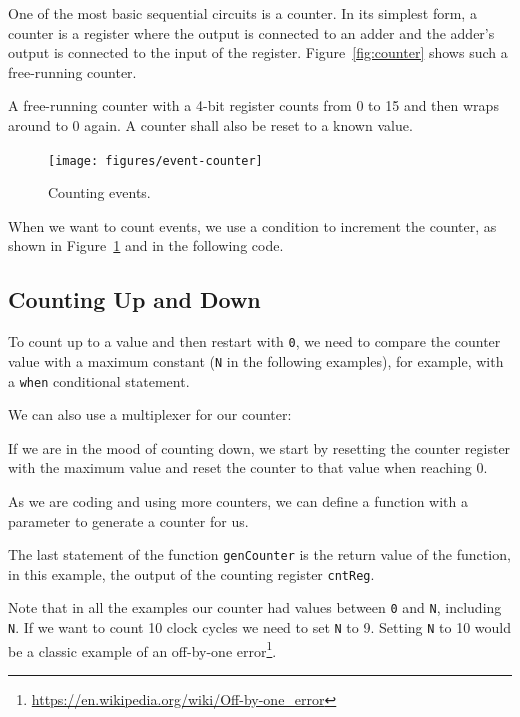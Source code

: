 \documentclass[%
    10pt,
    headinclude, footexclude,
    openright, %
    notitlepage,
    cleardoubleempty,
    headsepline,
    pointlessnumbers,
    bibtotoc, idxtotoc,
    ]{scrbook}
\newcommand{\code}[1]{{\lstinline[basicstyle=\small\ttfamily]{#1}}}
\newcommand{\myref}[2]{\href{#1}{#2}}
\renewcommand{\myref}[2]{{#2}{\footnote{\url{#1}}}}
\begin{document}
One of the most basic sequential circuits is a counter. In its simplest form, a counter is a register
where the output is connected to an adder and the adder's output is connected to the input
of the register. Figure~\ref{fig:counter} shows such a free-running counter.

A free-running counter with a 4-bit register counts from 0 to 15 and then wraps around
to 0 again. A counter shall also be reset to a known value.


\begin{figure}
  \centering
  \texttt{[image: figures/event-counter]}
  \caption{Counting events.}
  \label{fig:event-counter}
\end{figure}

\noindent When we want to count events, we use a condition to increment the counter,
as shown in Figure~\ref{fig:event-counter} and in the following code.


\subsection{Counting Up and Down}

To count up to a value and then restart with \code{0}, we need to compare
the counter value with a maximum constant (\code{N} in the following examples),
for example, with a \code{when} conditional statement.


\noindent We can also use a multiplexer for our counter:


\noindent If we are in the mood of counting down, we start by resetting the counter register
with the maximum value and reset the counter to that value when reaching 0.


\noindent As we are coding and using more counters, we can
define a function with a parameter to generate a counter for us.


\noindent The last statement of the function \code{genCounter} is the return
value of the function, in this example, the output of
the counting register \code{cntReg}.

Note that in all the examples our counter had values between \code{0} and
\code{N}, including \code{N}. If we want to count 10 clock cycles we need
to set \code{N} to 9. Setting \code{N} to 10 would be a classic example of an
\myref{https://en.wikipedia.org/wiki/Off-by-one_error}{off-by-one error}.
\end{document}
